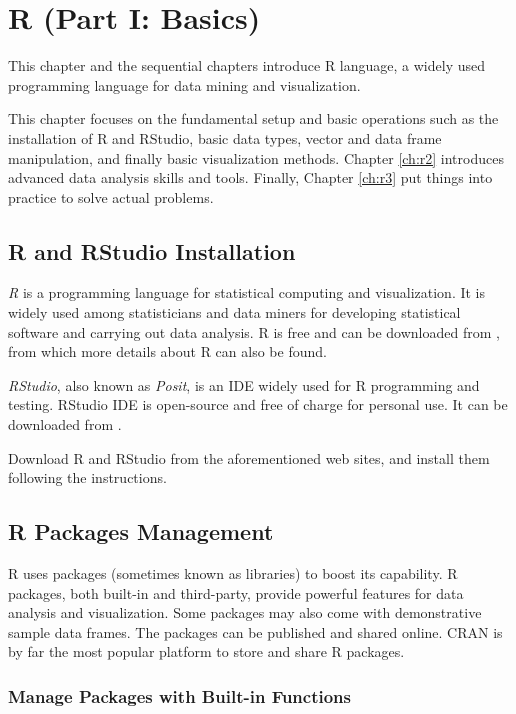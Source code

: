 \chapter{R (Part I: Basics)} \label{ch:r1}

This chapter and the sequential chapters introduce R language, a widely used programming language for data mining and visualization. 

This chapter focuses on the fundamental setup and basic operations such as the installation of R and RStudio, basic data types, vector and data frame manipulation, and finally basic visualization methods. Chapter \ref{ch:r2} introduces advanced data analysis skills and tools. Finally, Chapter \ref{ch:r3} put things into practice to solve actual problems.

\section{R and RStudio Installation} \label{ch:r1:sec:rinstallation}

\textit{R} is a programming language for statistical computing and visualization. It is widely used among statisticians and data miners for developing statistical software and carrying out data analysis. R is free and can be downloaded from \cite{r}, from which more details about R can also be found.

\textit{RStudio}, also known as \textit{Posit}, is an IDE widely used for R programming and testing. RStudio IDE is open-source and free of charge for personal use. It can be downloaded from \cite{rstudio}.

Download R and RStudio from the aforementioned web sites, and install them following the instructions.

\section{R Packages Management} \label{ch:r1:sec:rpackage}

R uses packages (sometimes known as libraries) to boost its capability. R packages, both built-in and third-party, provide powerful features for data analysis and visualization. Some packages may also come with demonstrative sample data frames. The packages can be published and shared online. CRAN is by far the most popular platform to store and share R packages.

\subsection{Manage Packages with Built-in Functions}

